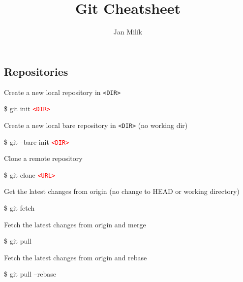 \documentclass[10pt,a4paper]{article}
\title{Git Cheatsheet}
\author{Jan Milík}
\newenvironment{cheatentry}{%
    \noindent%
    \begin{minipage}{\columnwidth}%
    \small%
    \noindent%
}{%
    \end{minipage}%
}
\newcommand{\entrysep}{\vspace{1em}}
\newcommand{\cheatcmd}[1]{%
    \noindent\begin{cmdbox}{\large\ttfamily\fontseries{b}\selectfont #1}\end{cmdbox}
}
\newcommand{\cheatmetavar}[1]{%
    \textcolor{red}{\texttt{\textless{}#1\textgreater{}}}%
}
\newcommand{\cheatmetavarref}[1]{%
    {\texttt{\textless{}#1\textgreater{}}}%
}
\begin{document}

\begin{multicols}{4}


\section{Repositories}%

\begin{cheatentry}%
Create a new local repository in \cheatmetavarref{DIR}
\cheatcmd{\$ git init \cheatmetavar{DIR}}
\end{cheatentry}

\entrysep{}%

\begin{cheatentry}%
Create a new local bare repository in \cheatmetavarref{DIR} (no working dir)
\cheatcmd{\$ git --bare init \cheatmetavar{DIR}}
\end{cheatentry}

\entrysep{}%

\begin{cheatentry}%
Clone a remote repository
\cheatcmd{\$ git clone \cheatmetavar{URL}}
\end{cheatentry}

\entrysep{}%

\begin{cheatentry}%
Get the latest changes from origin (no change to HEAD or working directory)
\cheatcmd{\$ git fetch}
\end{cheatentry}

\entrysep{}%

\begin{cheatentry}%
Fetch the latest changes from origin and merge
\cheatcmd{\$ git pull}
\end{cheatentry}

\entrysep{}%

\begin{cheatentry}%
Fetch the latest changes from origin and rebase
\cheatcmd{\$ git pull --rebase}
\end{cheatentry}

\entrysep{}%


\end{multicols}
\end{document}
